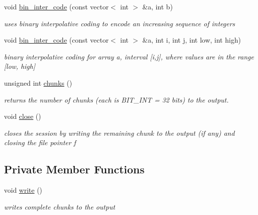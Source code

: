 \begin{DoxyCompactItemize}
void \hyperlink{classobitstream_a945c237be04936240953ba927486cde1}{bin\+\_\+inter\+\_\+code} (const vector$<$ int $>$ \&a, int b)
\begin{DoxyCompactList}\small\item\em uses binary interpolative coding to encode an increasing sequence of integers \end{DoxyCompactList}\item 
void \hyperlink{classobitstream_aae355189c570d0fb7c3aa01ee3e71d8a}{bin\+\_\+inter\+\_\+code} (const vector$<$ int $>$ \&a, int i, int j, int low, int high)
\begin{DoxyCompactList}\small\item\em binary interpolative coding for array a, interval \mbox{[}i,j\mbox{]}, where values are in the range \mbox{[}low, high\mbox{]} \end{DoxyCompactList}\item 
unsigned int \hyperlink{classobitstream_ae835de27953b678b5b4ce5b33033d529}{chunks} ()
\begin{DoxyCompactList}\small\item\em returns the number of chunks (each is B\+I\+T\+\_\+\+I\+NT = 32 bits) to the output. \end{DoxyCompactList}\item 
void \hyperlink{classobitstream_a6d76dbba302e1181fbc9609072a4c2a0}{close} ()
\begin{DoxyCompactList}\small\item\em closes the session by writing the remaining chunk to the output (if any) and closing the file pointer f \end{DoxyCompactList}\end{DoxyCompactItemize}
\subsection*{Private Member Functions}
\begin{DoxyCompactItemize}
\item 
void \hyperlink{classobitstream_a5ac23633932baad040856f0a33ee1ebf}{write} ()
\begin{DoxyCompactList}\small\item\em writes complete chunks to the output \end{DoxyCompactList}\end{DoxyCompactItemize}
